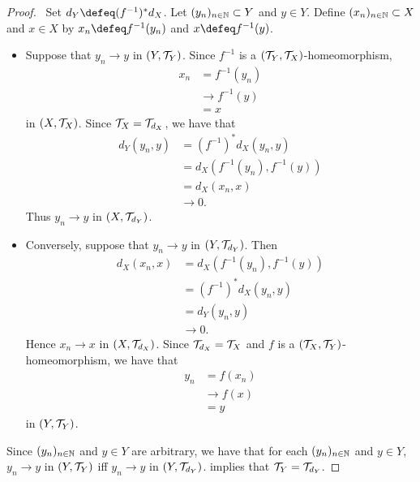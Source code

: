 \documentclass{book}
\begin{document}
\begin{proof}\
		Set $d_Y \defeq (f^{-1})^*d_X$. Let $(y_n)_{n \in \mathbb{N}} \subset Y$ and $y \in Y$. Define $(x_n)_{n \in \mathbb{N}} \subset X$ and $x \in X$ by $x_n \defeq f^{-1}(y_n)$ and $x \defeq f^{-1}(y)$. 
		\begin{itemize}
			\item Suppose that $y_n \rightarrow y$ in $(Y, \mathcal{T}_Y)$. Since $f^{-1}$ is a $(\mathcal{T}_Y, \mathcal{T}_X)$-homeomorphism, 
			\begin{align*}
				x_n
				& = f^{-1}(y_n) \\
				& \rightarrow f^{-1}(y) \\
				& = x
			\end{align*}
			in $(X, \mathcal{T}_X)$. Since $\mathcal{T}_X = \mathcal{T}_{d_X}$, we have that
			\begin{align*}
				d_Y(y_n, y)
				& = (f^{-1})^*d_X(y_n, y) \\
				& = d_X(f^{-1}(y_n), f^{-1}(y)) \\
				& = d_X(x_n, x) \\
				& \rightarrow 0.
			\end{align*} 
			Thus $y_n \rightarrow y$ in $(X, \mathcal{T}_{d_Y})$. 
			\item Conversely, suppose that $y_n \rightarrow y$ in $(Y, \mathcal{T}_{d_Y})$. Then 
			\begin{align*}
				d_X(x_n, x)
				& = d_X(f^{-1}(y_n), f^{-1}(y)) \\
				& = (f^{-1})^*d_X(y_n, y) \\
				&= d_Y(y_n, y) \\
				& \rightarrow 0.
			\end{align*}
			Hence $x_n \rightarrow x$ in $(X, \mathcal{T}_{d_X})$. Since $\mathcal{T}_{d_X} = \mathcal{T}_X$ and $f$ is a $(\mathcal{T}_X, \mathcal{T}_Y)$-homeomorphism, we have that 
			\begin{align*}
				y_n
				& = f(x_n) \\
				& \rightarrow f(x) \\
				& = y
			\end{align*}
			in $(Y, \mathcal{T}_Y)$. 
	\end{itemize}
	Since $(y_n)_{n \in \mathbb{N}}$ and $y \in Y$ are arbitrary, we have that for each $(y_n)_{n \in \mathbb{N}}$ and $y \in Y$, $y_n \rightarrow y$ in $(Y, \mathcal{T}_Y)$ iff $y_n \rightarrow y$ in $(Y, \mathcal{T}_{d_Y})$.  implies that $\mathcal{T}_Y = \mathcal{T}_{d_Y}$. 
\end{proof}
\end{document}
